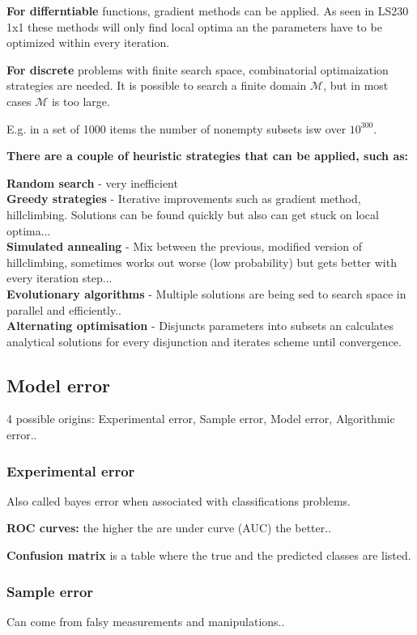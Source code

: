 \documentclass[fleqn, oneside, 10pt, titlepage]{article}
\begin{document}
\textbf{For differntiable} functions, gradient methods can be applied. As seen in LS230 1x1 these methods will only find local optima an the parameters have to be optimized within every iteration.

\textbf{For discrete} problems with finite search space, combinatorial optimaization strategies are needed. It is possible to search a finite domain $\mathcal{M}$, but in most cases $\mathcal{M}$ is too large.

E.g. in a set of 1000 items the number of nonempty subsets isw over $10^{300}$.

\textbf{There are a couple of heuristic strategies that can be applied, such as:}

\textbf{Random search} - very inefficient\\
\textbf{Greedy strategies} - Iterative improvements such as gradient method, hillclimbing. Solutions can be found quickly but also can get stuck on local optima...\\
\textbf{Simulated annealing} - Mix between the previous, modified version of hillclimbing, sometimes works out worse (low probability) but gets better with every iteration step...\\
\textbf{Evolutionary algorithms} - Multiple solutions are being sed to search space in parallel and efficiently..\\
\textbf{Alternating optimisation} - Disjuncts parameters into subsets an calculates analytical solutions for every disjunction and iterates scheme until convergence.

\subsection{Model error}
4 possible origins: Experimental error, Sample error, Model error, Algorithmic error..

\subsubsection{Experimental error}
Also called bayes error when associated with classifications problems.

\textbf{ROC curves:} the higher the are under curve (AUC) the better..

\textbf{Confusion matrix} is a table where the true and the predicted classes are listed.

\subsubsection{Sample error}
Can come from falsy measurements and manipulations..
\end{document}
